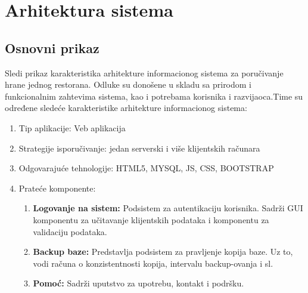 \newpage
\section{Arhitektura sistema}
\subsection{Osnovni prikaz}
Sledi prikaz karakteristika arhitekture informacionog sistema za poručivanje hrane jednog restorana. Odluke su donošene u skladu sa prirodom i funkcionalnim zahtevima sistema, kao i potrebama korisnika i razvijaoca.Time su određene sledeće karakteristike arhitekture informacionog sistema:
\begin{enumerate}
    \item Tip aplikacije: Veb aplikacija
    \item Strategije isporučivanje: jedan serverski i više klijentskih računara
    \item Odgovarajuće tehnologije: HTML5, MYSQL, JS, CSS, BOOTSTRAP
    \item Prateće komponente:
    \begin{enumerate}
        \item \textbf{Logovanje na sistem:} Podsistem za autentikaciju korisnika. Sadrži GUI komponentu za učitavanje klijentskih podataka i komponentu za validaciju podataka.
        \item \textbf{Backup baze:} Predstavlja podsistem za pravljenje kopija baze. Uz to, vodi računa o konzistentnosti kopija, intervalu backup-ovanja i sl.
        \item \textbf{Pomoć:} Sadrži uputstvo za upotrebu, kontakt i podršku.
        
    \end{enumerate}
\end{enumerate}

